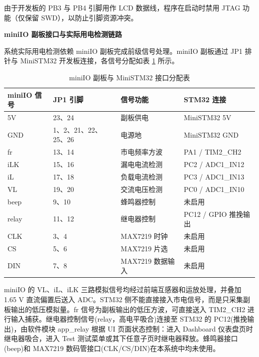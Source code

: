 \documentclass[UTF8,a4paper,zihao=-4,fontset=macnew]{ctexart}
\begin{document}
由于开发板的 PB3 与 PB4 引脚用作 LCD 数据线，程序在启动时禁用 JTAG 功能（仅保留 SWD），以防止引脚资源冲突。

\textbf{miniIO 副板接口与实际用电检测链路}

系统实际用电检测依赖 miniIO 副板完成前级信号处理。miniIO 副板通过 JP1 排针与 MiniSTM32 开发板连接，各信号分配如表 \ref{tab:miniio-iface} 所示。

\begin{table}[H]
\centering
{}
\caption{miniIO 副板与 MiniSTM32 接口分配表}
\label{tab:miniio-iface}
\begin{tabular}{llll}
\toprule
miniIO 信号 & JP1 引脚 & 信号功能 & STM32 连接 \\
\midrule
5V  & 23、24 & 副板供电 & MiniSTM32 5V \\
GND & 1、2、21、22、25、26 & 电源地 & MiniSTM32 GND \\
fr  & 13、14 & 市电频率方波 & PA1 / TIM2\_CH2 \\
iLK & 15、16 & 漏电电流检测 & PC2 / ADC1\_IN12 \\
iL  & 17、18 & 负载电流检测 & PC3 / ADC1\_IN13 \\
VL  & 19、20 & 交流电压检测 & PC0 / ADC1\_IN10 \\
beep & 9、10 & 蜂鸣器控制 & 未启用 \\
relay & 11、12 & 继电器控制 & PC12 / GPIO 推挽输出 \\
CLK & 3、4 & MAX7219 时钟 & 未启用 \\
CS  & 5、6 & MAX7219 片选 & 未启用 \\
DIN & 7、8 & MAX7219 数据输入 & 未启用 \\
\bottomrule
\end{tabular}
\end{table}

miniIO 的 VL、iL、iLK 三路模拟信号均经过前端互感器和运放处理，并叠加 1.65 V 直流偏置后送入 ADC。STM32 侧不能直接接入市电信号，而是只采集副板输出的低压模拟量。fr 信号为副板输出的低压方波，可直接送入 TIM2\_CH2 进行输入捕获。继电器控制信号(relay，高电平吸合)连接至 STM32 的 PC12(推挽输出)，由软件模块 app\_relay 根据 UI 页面状态控制：进入 Dashboard 仪表盘页时继电器吸合，进入 Test 测试菜单或其下任意子页时继电器释放。蜂鸣器接口(beep)和 MAX7219 数码管接口(CLK/CS/DIN)在本系统中均未使用。
\end{document}
